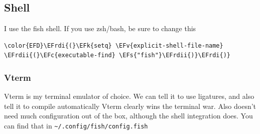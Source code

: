 \documentclass{scrartcl}
\newcommand{\EFk}[1]{\textcolor{EFk}{#1}} %
\newcommand{\EFs}[1]{\textcolor{EFs}{#1}} %
\newcommand{\EFc}[1]{\textcolor{EFc}{#1}} %
\newcommand{\EFv}[1]{\textcolor{EFv}{#1}} %
\newcommand{\EFrdi}[1]{\textcolor{EFrdi}{#1}} %
\newcommand{\EFrdii}[1]{\textcolor{EFrdii}{#1}} %
\begin{document}
\subsection{Shell}
\label{sec:org542c1af}
I use the fish shell. If you use zsh/bash, be sure to change this
\begin{Code}
\begin{Verbatim}[]
\color{EFD}\EFrdi{(}\EFk{setq} \EFv{explicit-shell-file-name} \EFrdii{(}\EFc{executable-find} \EFs{"fish"}\EFrdii{)}\EFrdi{)}
\end{Verbatim}
\end{Code}

\subsubsection{Vterm}
\label{sec:orgd87755f}
Vterm is my terminal emulator of choice. We can tell it to use ligatures, and also tell it to compile automatically
Vterm clearly wins the terminal war. Also doesn't need much configuration out of
the box, although the shell integration does. You can find that in \texttt{\textasciitilde{}/.config/fish/config.fish}
\end{document}

